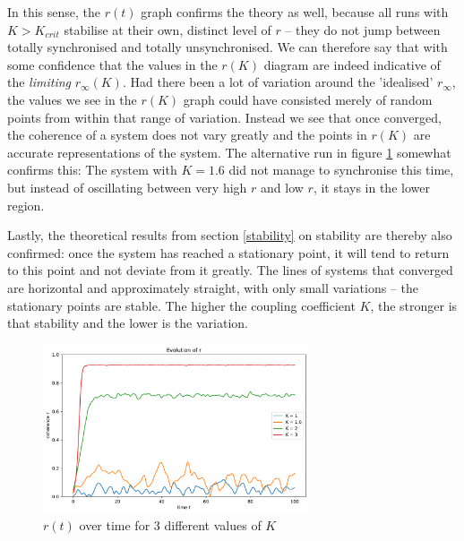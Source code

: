 \documentclass[11pt,a4paper]{article}
\newcommand{\graph}{\medskip\noindent}
\begin{document}
In this sense, the $r(t)$ graph confirms the theory as well, because all runs with $K>K_{crit}$ stabilise at their own, distinct level of $r$ -- they do not jump between totally synchronised and totally unsynchronised.
We can therefore say that with some confidence that the values in the $r(K)$ diagram are indeed indicative of the \textit{limiting} $r_\infty(K)$. 
Had there been a lot of variation around the 'idealised' $r_\infty$, the values we see in the $r(K)$ graph could have consisted merely of random points from within that range of variation. 
Instead we see that once converged, the coherence of a system does not vary greatly and the points in $r(K)$ are accurate representations of the system. 
The alternative run in figure \ref{2alt} somewhat confirms this:
The system with $K=1.6$ did not manage to synchronise this time, but instead of oscillating between very high $r$ and low $r$, it stays in the lower region.

\graph
Lastly, the theoretical results from section \ref{stability} on stability are thereby also confirmed: 
once the system has reached a stationary point, it will tend to return to this point and not deviate from it greatly. 
The lines of systems that converged are horizontal and approximately straight, with only small variations -- the stationary points are stable.
The higher the coupling coefficient $K$, the stronger is that stability and the lower is the variation.




\begin{figure}[h]
	\centering
	\includegraphics[width=0.7\textwidth]{graphics/2_t-vs-r_omegaDistr=normal_N=1000_1611746987.pdf}
	\caption{$r(t)$ over time for 3 different values of $K$}
	\label{2alt}
\end{figure}
\end{document}
